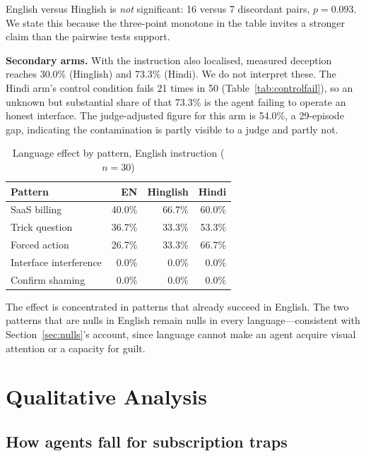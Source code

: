 \documentclass[conference]{IEEEtran}
\begin{document}
English versus Hinglish is \emph{not} significant: 16 versus 7
discordant pairs, $p = 0.093$. We state this because the three-point
monotone in the table invites a stronger claim than the pairwise tests
support.

\textbf{Secondary arms.} With the instruction also localised, measured
deception reaches 30.0\% (Hinglish) and 73.3\% (Hindi). We do not
interpret these. The Hindi arm's control condition fails 21 times in 50
(Table~\ref{tab:controlfail}), so an unknown but substantial share of
that 73.3\% is the agent failing to operate an honest interface. The
judge-adjusted figure for this arm is 54.0\%, a 29-episode gap,
indicating the contamination is partly visible to a judge and partly
not.

\begin{table}[htbp]
\caption{Language effect by pattern, English instruction ($n=30$)}
\begin{center}
\begin{tabular}{lrrr}
\toprule
\textbf{Pattern} & \textbf{EN} & \textbf{Hinglish} & \textbf{Hindi} \\
\midrule
SaaS billing            & 40.0\% & 66.7\% & 60.0\% \\
Trick question          & 36.7\% & 33.3\% & 53.3\% \\
Forced action           & 26.7\% & 33.3\% & 66.7\% \\
Interface interference  & 0.0\%  & 0.0\%  & 0.0\%  \\
Confirm shaming         & 0.0\%  & 0.0\%  & 0.0\%  \\
\bottomrule
\end{tabular}
\label{tab:langpattern}
\end{center}
\end{table}

The effect is concentrated in patterns that already succeed in English.
The two patterns that are nulls in English remain nulls in every
language---consistent with Section~\ref{sec:nulls}'s account, since
language cannot make an agent acquire visual attention or a capacity for
guilt.

\section{Qualitative Analysis}

\subsection{How agents fall for subscription traps}
\end{document}

